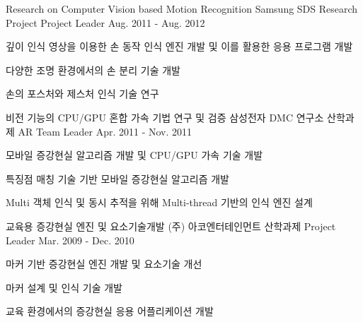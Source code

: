 \begin{cventries}
  \cventry
    {Research on Computer Vision based Motion Recognition} %
    {Samsung SDS Research Project} %
    {Project Leader} %
    {Aug. 2011 - Aug. 2012} %
    {
      \begin{cvitems} %
        \item {깊이 인식 영상을 이용한 손 동작 인식 엔진 개발 및 이를 활용한 응용 프로그램 개발}
        \item {다양한 조명 환경에서의 손 분리 기술 개발}
        \item {손의 포스처와 제스처 인식 기술 연구}
      \end{cvitems}
    }

  \cventry
    {비전 기능의 CPU/GPU 혼합 가속 기법  연구 및 검증} %
    {삼성전자 DMC 연구소 산학과제} %
    {AR Team Leader} %
    {Apr. 2011 - Nov. 2011} %
    {
      \begin{cvitems} %
        \item{모바일 증강현실 알고리즘 개발 및 CPU/GPU 가속 기술 개발}
        \item {특징점 매칭 기술 기반 모바일 증강현실 알고리즘 개발}
        \item {Multi 객체 인식 및 동시 추적을 위해 Multi-thread 기반의 인식 엔진 설계}
      \end{cvitems}
    }

  \cventry
    {교육용 증강현실 엔진 및 요소기술개발} %
    {(주) 아코엔터테인먼트 산학과제} %
    {Project Leader} %
    {Mar. 2009 - Dec. 2010} %
    {
      \begin{cvitems} %
        \item {마커 기반 증강현실 엔진 개발 및 요소기술 개선}
        \item {마커 설계 및 인식 기술 개발}
        \item {교육 환경에서의 증강현실 응용 어플리케이션 개발}
      \end{cvitems}
    }


\end{cventries}
